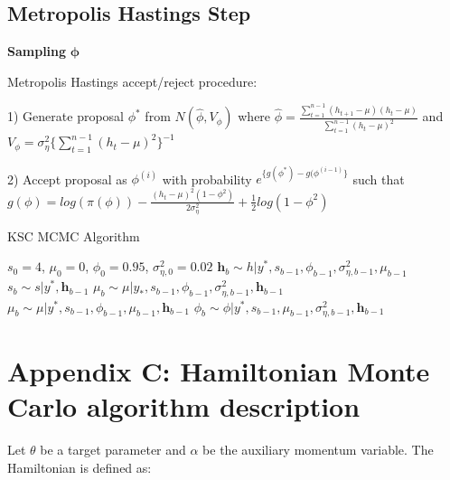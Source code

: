 \documentclass[12pt, a4paper]{article}
\begin{document}
\subsection*{Metropolis Hastings Step}
\textbf{Sampling}  $\boldsymbol{\phi}$

Metropolis Hastings accept/reject procedure:

1) Generate proposal $\phi^\ast$ from $N(\hat{\phi}, V_{\phi})$ where $\hat{\phi} = \frac{\sum_{t=1}^{n-1} (h_{t+1} - \mu)(h_t - \mu)}{\sum_{t=1}^{n-1} (h_t - \mu)^2}$ and $V_{\phi} = \sigma^2_{\eta} \{\sum_{t=1}^{n-1} (h_t - \mu)^2\}^{-1}$

2) Accept proposal as $\phi^{(i)}$ with probability $e^{\{g(\phi^\ast) - g(\phi^{(i-1)}\}}$ such that $g(\phi) = log (\pi (\phi)) - \frac {(h_t - \mu)^2 (1-\phi^2)}{2 \sigma_{\eta}^2} + \frac{1}{2} log (1-\phi^2)$


        \begin{algorithm}[H]
            \caption{KSC MCMC Algorithm}\label{alg:ksc}
            \begin{algorithmic}
            \Require $s_0 = 4$, $\mu_0 = 0$, $\phi_0 = 0.95$, $\sigma^{2}_{\eta,0} = 0.02$
                    \State {} $\boldsymbol{h}_b \sim h|y^{\ast}, s_{b-1}, \phi_{b-1}, \sigma^{2}_{\eta,b-1}, \mu_{b-1}$ 
                    \State {} $s_b \sim s|y^{\ast}, \boldsymbol{h}_{b-1}$
                    \State {} $\mu_b \sim \mu|y_{\ast}, s_{b-1}, \phi_{b-1}, \sigma^{2}_{\eta, b-1}, \boldsymbol{h}_{b-1}$
                    \State {} $\mu_b \sim \mu|y^{\ast}, s_{b-1}, \phi_{b-1}, \mu_{b-1}, \boldsymbol{h}_{b-1}$
                    \State {} $\phi_b \sim \phi|y^{\ast}, s_{b-1}, \mu_{b-1}, \sigma^{2}_{\eta, b-1}, \boldsymbol{h}_{b-1}$
                  \EndFor
            \end{algorithmic}
            \end{algorithm}

\newpage

\section{Appendix C: Hamiltonian Monte Carlo algorithm description}
Let $\theta$ be a target parameter and $\alpha$ be the auxiliary momentum variable. The Hamiltonian is defined as:
\end{document}
